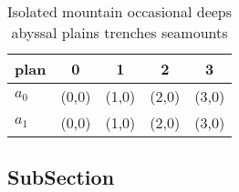 \documentclass[a4paper]{article}
\begin{document}
\begin{table}
\begin{adjustbox}{width=0.5\columnwidth}
\begin{tabular}{|l|l|l|l|l|}
\hline
\textbf{plan} & \multicolumn{1}{c|}{\textbf{0}} & \multicolumn{1}{c|}{\textbf{1}} & \multicolumn{1}{c|}{\textbf{2}} & \multicolumn{1}{c|}{\textbf{3}} \\ \hline
\textbf{$a_0$}  & (0,0) & (1,0) & (2,0) & (3,0) \\ \hline
\textbf{$a_1$}  & (0,0) & (1,0) & (2,0) & (3,0) \\ \hline
\end{tabular}
\end{adjustbox}
\caption{Isolated mountain occasional deeps abyssal plains trenches seamounts 
}
\end{table}

\subsection{SubSection}
\end{document}
